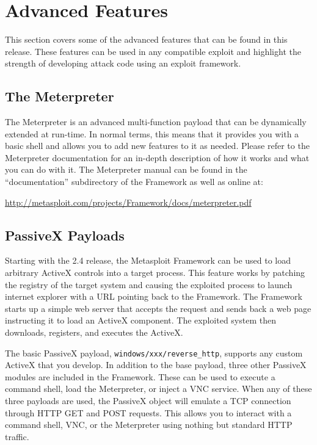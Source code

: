 \documentclass{report}
\begin{document}
\pagebreak
\chapter{Advanced Features}

\par
This section covers some of the advanced features that can be found in this
release. These features can be used in any compatible exploit and highlight
the strength of developing attack code using an exploit framework. 

\section{The Meterpreter}
\par
The Meterpreter is an advanced multi-function payload that can be dynamically
extended at run-time. In normal terms, this means that it provides you with a
basic shell and allows you to add new features to it as needed. Please refer
to the Meterpreter documentation for an in-depth description of how it works
and what you can do with it. The Meterpreter manual can be found in the
``documentation'' subdirectory of the Framework as well as online at:

\url{http://metasploit.com/projects/Framework/docs/meterpreter.pdf}

\section{PassiveX Payloads}

\par Starting with the 2.4 release, the Metasploit Framework can be used to
load arbitrary ActiveX controls into a target process. This feature works by
patching the registry of the target system and causing the exploited process
to launch internet explorer with a URL pointing back to the Framework. The
Framework starts up a simple web server that accepts the request and sends
back a web page instructing it to load an ActiveX component. The exploited
system then downloads, registers, and executes the ActiveX. 

\par
The basic PassiveX payload, \texttt{windows/xxx/reverse\_http}, supports any
custom ActiveX that you develop. In addition to the base payload, three other
PassiveX modules are included in the Framework. These can be used to execute a
command shell, load the Meterpreter, or inject a VNC service. When any of
these three payloads are used, the PassiveX object will emulate a TCP
connection through HTTP GET and POST requests. This allows you to interact
with a command shell, VNC, or the Meterpreter using nothing but standard HTTP
traffic.
\end{document}
